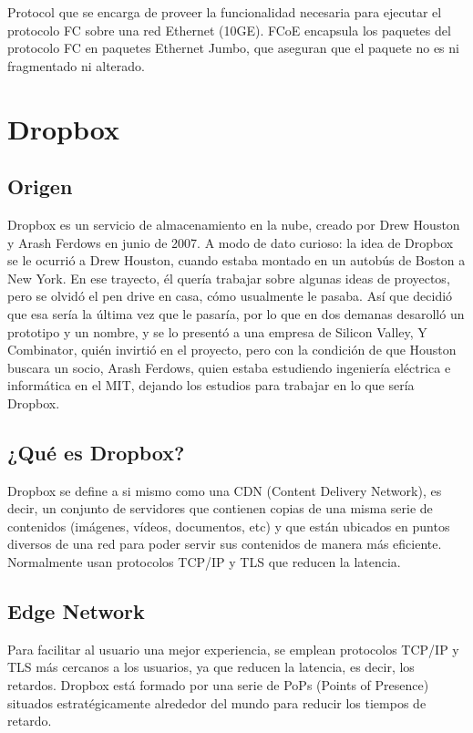 Protocol que se encarga de proveer la funcionalidad necesaria para ejecutar el protocolo FC sobre una red Ethernet (10GE). FCoE encapsula los paquetes del protocolo FC en paquetes Ethernet Jumbo, que aseguran que el paquete no es ni fragmentado ni alterado.


\section{Dropbox}

\subsection{Origen}
Dropbox es un servicio de almacenamiento en la nube, creado por Drew Houston y Arash Ferdows en junio de 2007. A modo de dato curioso: la idea de Dropbox se le ocurrió a Drew Houston, cuando estaba montado en un autobús de Boston a New York. En ese trayecto, él quería trabajar sobre algunas ideas de proyectos, pero se olvidó el pen drive en casa, cómo usualmente le pasaba. Así que decidió que esa sería la última vez que le pasaría, por lo que en dos demanas desarolló un prototipo y un nombre, y se lo presentó a una empresa de Silicon Valley, Y Combinator, quién invirtió en el proyecto, pero con la condición de que Houston buscara un socio, Arash Ferdows, quien estaba estudiendo ingeniería eléctrica e informática en el MIT, dejando los estudios para trabajar en lo que sería Dropbox.

\subsection{¿Qué es Dropbox?}
Dropbox se define a si mismo como una CDN (Content Delivery Network), es decir, un conjunto de servidores que contienen copias de una misma serie de contenidos (imágenes, vídeos, documentos, etc) y que están ubicados en puntos diversos de una red para poder servir sus contenidos de manera más eficiente. Normalmente usan protocolos TCP/IP y TLS que reducen la latencia.
\subsection{Edge Network}
Para facilitar al usuario una mejor experiencia, se emplean protocolos TCP/IP y TLS más cercanos a los usuarios, ya que reducen la latencia, es decir, los retardos. Dropbox está formado por una serie de PoPs (Points of Presence) situados estratégicamente alrededor del mundo para reducir los tiempos de retardo.

